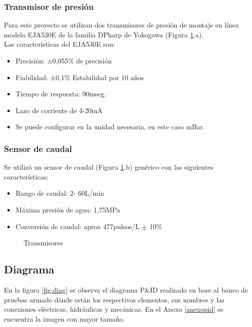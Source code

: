 \subsubsection{Transmisor de presión}
Para este proyecto se utilizan dos transmisores de presión de montaje en línea modelo EJA530E de la familia  DPharp de Yokogawa (Figura \ref{fig:transd}.a).\\
Las características del EJA530E son:
\begin{itemize}
	\item Precisión: ±0,055\% de precisión
	\item Fiabilidad: ±0,1\% Estabilidad por 10 años
	\item Tiempo de respuesta: 90mseg.
	\item Lazo de corriente de 4-20mA
	\item Se puede configurar en la unidad necesaria, en este caso mBar.
\end{itemize}


\subsubsection{Sensor de caudal}
Se utilizó un sensor de caudal (Figura \ref{fig:transd}.b) genérico con las siguientes características:
\begin{itemize}
	\item Rango de caudal: 2- 60L/min
	\item Máxima presión de agua: 1,75MPa
	\item Conversión de caudal: aprox 477pulsos/L $\pm$ 10\%
\end{itemize}


\begin{figure}[htbp]
	\centering
	\caption{Transmisores} \label{fig:transd}
\end{figure}





\subsection{Diagrama}
En la figura \ref{fig:diag} se observa el diagrama P\&ID realizado en base al banco de pruebas armado dónde están los respectivos elementos, sus nombres y las conexiones eléctricas, hidráulicas y mecánicas. En el Anexo \ref{anexopid} se encuentra la imagen con mayor tamaño.

